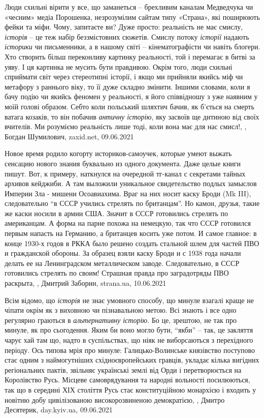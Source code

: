 Люди схильні вірити у все, що заманеться – брехливим каналам Медведчука чи
«чесним» медіа Порошенка, незрозумілим сайтам типу «Страна», які поширюють
фейки та міфи. Чому, запитаєте ви? Дуже просто: реальність не має смислу,
\emph{історія} – це теж набір беззмістовних сюжетів. Смислу потоку \emph{історії} надають
\emph{історики} чи письменники, а в нашому світі – кінематографісти чи навіть блогери.
Хто створить більш переконливу картинку реальності, той і перемагає в битві за
уяву. І ця картинка не мусить бути правдивою. Окрім того, люди схильні
сприймати світ через стереотипні історії, і якщо ми прийняли якийсь міф чи
метафору з раннього віку, то її дуже складно змінити. Іншими словами, коли я
бачу подію чи якийсь феномен у реальності, я його співвідношу з уже наявним у
моїй голові образом. Себто коли польський шляхтич бачив, як б'ється на смерть
ватага козаків, то він побачив \emph{античну історію}, яку засвоїв ще дитиною від
своїх вчителів. Ми розуміємо реальність лише тоді, коли вона має для нас смисл!,
, Богдан Шумилович, zaxid.net, 09.06.2021

Новое время родило когорту историков-самоучек, которые умеют выжать сенсацию
нового знания буквально из одного документа. Даже целые книги пишут. Вот, к
примеру, наткнулся на очередной тг-канал с секретами тайных архивов кейджиби. А
там выложили уникальное свидетельство подлых замыслов Империи Зла - мишени
Осоавиахима. Враг на них носит каску Броди (Mk III), следовательно \enquote{в СССР
учились стрелять по британцам}. Но камон, друзья, такие же каски носили в
армии США. Значит в СССР готовились стрелять по американцам. А форма на парне
похожа на немецкую, так что СССР готовился первым напасть на Германию, а
британцев косить уже потом. И самое главное: в конце 1930-х годов в РККА было
решено создать стальной шлем для частей ПВО и гражданской обороны. За образец
взяли каску Броди и с 1938 года начали делать ее на Ленинградском металлическом
заводе.  Следовательно, в СССР готовились стрелять по своим! Страшная правда
про заградотряды ПВО раскрыта,
, Дмитрий Заборин, strana.ua, 10.06.2021


Всім відомо, що \emph{історія} не знає умовного способу, що минуле взагалі краще не
чіпати окрім як з виховною чи пізнавальною метою. Всі знають і все одно
регулярно граються в \emph{альтернативну історію}. Бо це, зрештою, не так про минуле,
як про сьогодення. Яким би воно могло бути, \enquote{якби} – так, це закляття чарує хай
там що, надто в суспільствах, що ніяк не виборсаються з перехідного періоду.
Ось типова мрія про минуле: Галицько-Волинське князівство поступово стає одним
з наймогутніших східноєвропейських гравців, укладає кілька вигідних
регіональних пактів, звільняє українські землі від Орди і перетворюється на
Королівство Русь. Місцеве самоврядування та народні вольності посилюються, так
що в середині ХІХ століття Русь стає конституційною монархією і входить у
новітню добу цивілізованою високорозвиненою демократією,
, Дмитро Десятерик, day.kyiv.ua, 09.06.2021


